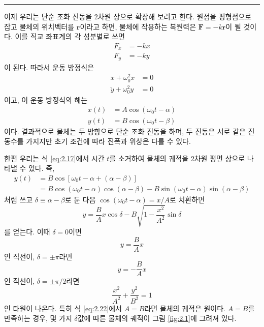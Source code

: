 \documentclass[chapter, oneside, b5paper]{oblivoir}
\theoremstyle{plain}
\theoremstyle{definition}
\theoremstyle{remark}
\begin{document}
\noindent\rule{\textwidth}{0.8pt} %
\vspace{1em} %

이제 우리는 단순 조화 진동을 2차원 상으로 확장해 보려고 한다. 원점을 평형점으로 잡고 물체의 위치벡터를 $\textbf{r}$이라고 하면, 물체에 작용하는 복원력은 $\textbf{F} = -k\textbf{r}$이 될 것이다. 이를 직교 좌표계의 각 성분별로 쓰면
\begin{equation}
    \begin{aligned}
       F_x &= -kx \\ F_y &= -ky \label{eq:2.15}
    \end{aligned}
\end{equation}
이 된다. 따라서 운동 방정식은
\begin{equation}
\begin{aligned}
    \ddot{x} + \omega^2_0x &= 0 \\
    \ddot{y} + \omega^2_0y &= 0 \label{eq:2.16}
\end{aligned}
\end{equation}
이고, 이 운동 방정식의 해는
\begin{equation}
\begin{aligned}
    x(t) &= A\cos{(\omega_0t-\alpha)} \\
    y(t) &= B\cos{(\omega_0t-\beta)} \label{eq:2.17}
\end{aligned}
\end{equation}
이다. 결과적으로 물체는 두 방향으로 단순 조화 진동을 하며, 두 진동은 서로 같은 진동수를 가지지만 초기 조건에 따라 진폭과 위상은 다를 수 있다.

한편 우리는 식 \ref{eq:2.17}에서 시간 $t$를 소거하여 물체의 궤적을 2차원 평면 상으로 나타낼 수 있다. 즉,
\begin{equation}
\begin{split}
    y(t) &= B\cos{[\omega_0t-\alpha+(\alpha-\beta)]} \\ 
         &= B\cos{(\omega_0t-\alpha)}\cos{(\alpha-\beta)}-B\sin{(\omega_0t-\alpha)}\sin{(\alpha-\beta)}
\end{split}
\label{eq:2.18}
\end{equation}
처럼 쓰고 $\delta \equiv \alpha-\beta$로 둔 다음 $\cos{(\omega_0t-\alpha)}=x/A$로 치환하면
\begin{equation}
    y = \frac{B}{A}x\cos{\delta} - B\sqrt{1-\frac{x^2}{A^2}}\sin{\delta} \label{eq:2.19}
\end{equation}
를 얻는다. 이때 $\delta=0$이면
\begin{equation}
    y = \frac{B}{A}x \label{eq:2.20}
\end{equation}
인 직선이, $\delta=\pm\pi$라면
\begin{equation}
    y = -\frac{B}{A}x \label{eq:2.21}
\end{equation}
인 직선이,
$\delta=\pm\pi/2$라면
\begin{equation}
    \frac{x^2}{A^2} + \frac{y^2}{B^2} = 1 \label{eq:2.22}
\end{equation}
인 타원이 나온다. 특히 식 \ref{eq:2.22}에서 $A=B$라면 물체의 궤적은 원이다. $A=B$를 만족하는 경우, 몇 가지 $\delta$값에 따른 물체의 궤적이 그림 \ref{fig:2.1}에 그려져 있다.
\end{document}
